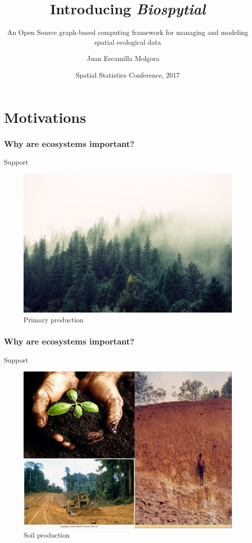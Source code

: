 \documentclass{beamer}
\title[Biospytial: a Graph Based Engine] %
{Introducing {\em Biospytial} }
\subtitle{An Open Source graph-based computing framework for managing and modeling spatial ecological data}
\author[Juan Escamilla Molgora] %
{Juan Escamilla Molgora~\inst{1} ~\inst{2}}
\institute[Lancaster University] %
{
  \inst{1}%
	Lancaster Environment Center
  \and
  \inst{2}%
  Data Science Institute
}
\date[SPAT2017] %
{Spatial Statistics Conference, 2017}
\begin{document}
\begin{frame}
\titlepage
\end{frame}

\section{Motivations}

\begin{frame}
		\frametitle{Why are ecosystems important?}
		\begin{exampleblock}{Support}			
				\begin{figure}				
				\centering
		    	\includegraphics[height=0.7\textheight,width=\textwidth]{forest1.jpeg}		    	    
				\caption{Primary production}
		    	\end{figure}
		\end{exampleblock}
	\end{frame}

	\begin{frame}
		\frametitle{Why are ecosystems important?}
		\begin{exampleblock}{Support}			
				\begin{figure}				
				\centering
		    	\includegraphics[height=0.7\textheight,width=\textwidth]{soil.jpg}		    	    
				\caption{Soil production}
		    	\end{figure}
		\end{exampleblock}
	\end{frame}
\end{document}

